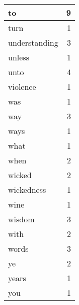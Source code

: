 \begin{center}
\begin{longtable}{l|r}
to & 9\\ \hline 
turn & 1\\ \hline 
understanding & 3\\ \hline 
unless & 1\\ \hline 
unto & 4\\ \hline 
violence & 1\\ \hline 
was & 1\\ \hline 
way & 3\\ \hline 
ways & 1\\ \hline 
what & 1\\ \hline 
when & 2\\ \hline 
wicked & 2\\ \hline 
wickedness & 1\\ \hline 
wine & 1\\ \hline 
wisdom & 3\\ \hline 
with & 2\\ \hline 
words & 3\\ \hline 
ye & 2\\ \hline 
years & 1\\ \hline 
you & 1\\ \hline 
\end{longtable}  
\end{center}  


  
\normalsize  

  
  
